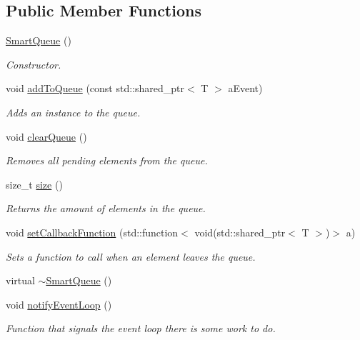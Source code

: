\subsection*{Public Member Functions}
\begin{DoxyCompactItemize}
\item 
\hyperlink{class_smart_queue_a12e3ef3a3d1ed0062f28fb6ae43c8acf}{Smart\+Queue} ()
\begin{DoxyCompactList}\small\item\em Constructor. \end{DoxyCompactList}\item 
void \hyperlink{class_smart_queue_a896d489b174bb960afd9bab1ee246ac6}{add\+To\+Queue} (const std\+::shared\+\_\+ptr$<$ T $>$ a\+Event)
\begin{DoxyCompactList}\small\item\em Adds an instance to the queue. \end{DoxyCompactList}\item 
void \hyperlink{class_smart_queue_a0d5f30e34e453d08103a587388a67617}{clear\+Queue} ()
\begin{DoxyCompactList}\small\item\em Removes all pending elements from the queue. \end{DoxyCompactList}\item 
size\+\_\+t \hyperlink{class_smart_queue_a05ad94528926d623d8fcb8da042cd889}{size} ()
\begin{DoxyCompactList}\small\item\em Returns the amount of elements in the queue. \end{DoxyCompactList}\item 
void \hyperlink{class_smart_queue_ac7f9a4d34bc09b2d2ea66aa91f418564}{set\+Callback\+Function} (std\+::function$<$ void(std\+::shared\+\_\+ptr$<$ T $>$)$>$ a)
\begin{DoxyCompactList}\small\item\em Sets a function to call when an element leaves the queue. \end{DoxyCompactList}\item 
virtual \hyperlink{class_smart_queue_aa1de2438e3776b873787e915f7adf356}{$\sim$\+Smart\+Queue} ()
\item 
void \hyperlink{class_smart_queue_ac8d665c15c424974a7eae42ba1cc3ad9}{notify\+Event\+Loop} ()
\begin{DoxyCompactList}\small\item\em Function that signals the event loop there is some work to do. \end{DoxyCompactList}\end{DoxyCompactItemize}


